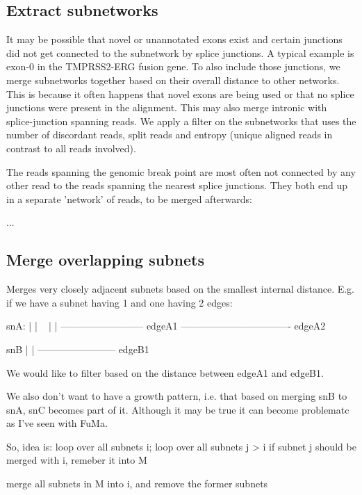 \documentclass{article}
\theoremstyle{definition}
\begin{document}
\subsection{Extract subnetworks}
It may be possible that novel or unannotated exons exist and certain junctions did not get connected to the subnetwork by splice junctions.
A typical example is exon-0 in the TMPRSS2-ERG fusion gene.
To also include those junctions, we merge subnetworks together based on their overall distance to other networks.
This is because it often happens that novel exons are being used or that no splice junctions were present in the alignment.
This may also merge intronic with splice-junction spanning reads.
We apply a filter on the subnetworks that uses the number of discordant reads, split reads and entropy (unique aligned reads in contrast to all reads involved).

The reads spanning the genomic break point are most often not connected by any other read to the reads spanning the nearest splice junctions.
They both end up in a separate 'network' of reads, to be merged afterwards:



...

\subsection{Merge overlapping subnets}

Merges very closely adjacent subnets based on the smallest internal distance.
E.g. if we have a subnet having 1 and one having 2 edges:
        
  snA:  |       |            ~             |
        |        --------------------------  edgeA1
         ----------------------------------  edgeA2

  snB         |                        |
               ------------------------      edgeB1

        We would like to filter based on the distance between edgeA1 and
        edgeB1.
        
        We also don't want to have a growth pattern, i.e. that based on
        merging snB to snA, snC becomes part of it. Although it may be
        true it can become problematc as I've seen with FuMa.
        
        So, idea is:
        loop over all subnets i;
            loop over all subnets j > i
                if subnet j should be merged with i, remeber it into M
            
            merge all subnets in M into i, and remove the former subnets
\end{document}
